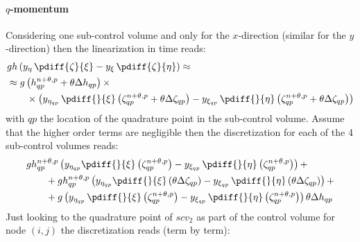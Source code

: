 \paragraph*{$q$-momentum}
Considering one sub-control volume and only for the $x$-direction (similar for the $y$-direction) then the linearization in time reads:
\begin{align}
    & g h \left( y_{\eta}\, \pdiff{\zeta}{\xi} - y_{\xi}\, \pdiff{\zeta}{\eta} \right) \approx
    \\
   & \approx g \left( h^{n+\theta,p}_{qp} + \theta \Delta h_{qp}\right)  \times
   \\*
   & \qquad \times \left( y_{\eta_{qp}}\, \pdiff{}{\xi}\left(\zeta^{n+\theta,p}_{qp} + \theta \Delta \zeta_{qp} \right)
 - y_{\xi_{qp}}\, \pdiff{}{\eta}\left(\zeta^{n+\theta,p}_{qp} + \theta \Delta \zeta_{qp}   \right)
   \right)
\end{align}
with $qp$ the location of the quadrature point in the sub-control volume.
Assume that the higher order terms are negligible then the discretization for each of the 4 sub-control volumes reads:
%
\begin{align}
&g h^{n+\theta,p}_{qp} \left( y_{\eta_{qp}}\pdiff{}{\xi}\left( \zeta^{n+\theta,p}_{qp} \right)
- y_{\xi_{qp}}\, \pdiff{}{\eta}\left(\zeta^{n+\theta,p}_{qp} \right) \right) +
\\
&\qquad + g h^{n+\theta,p}_{qp} \left( y_{\eta_{qp}}\pdiff{}{\xi}\left(\theta\Delta \zeta_{qp}\right)
- y_{\xi_{qp}}\, \pdiff{}{\eta} \left(\theta\Delta\zeta_{qp} \right)
\right) +
\\
&\qquad + g
\left( y_{\eta_{qp}}\, \pdiff{}{\xi}\left(\zeta^{n+\theta,p}_{qp} \right)
 - y_{\xi_{qp}}\, \pdiff{}{\eta}\left(\zeta^{n+\theta,p}_{qp} \right)
\right)\theta \Delta h_{qp}
\end{align}
Just looking to the quadrature point of $scv_2$ as part of the control volume for node $(i,j)$ the discretization reads (term by term):
